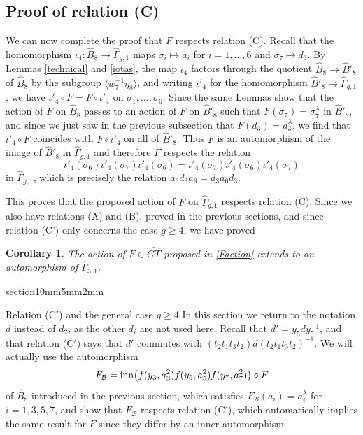 \documentclass[a4paper,10pt,reqno]{amsart}
\makeatletter
\newcommand\GT{\widehat{GT}}
\newcommand\B{\widehat{B}}
\newcommand\GGone{\widehat{\Gamma}_{g,1}}
\newtheorem{cor}[thm]{Corollary}
\renewcommand{\section}{\@startsection
{section}{1}{0mm}{5mm}{2mm}{\raggedright\bfseries}}
\makeatother
\begin{document}
\subsection{Proof of relation (C)}

We can now complete the proof that $F$ respects relation (C).
Recall that the homomorphism $\iota_4:\B_8\rightarrow \GGone$ maps $\sigma_i\mapsto a_i$
for $i=1,\ldots,6$ and $\sigma_7\mapsto d_3$. By Lemmas \ref{technical} and \ref{iotas}, 
the map $\iota_4$ factors through the quotient $\B_8\rightarrow \B'_8$ of $\B_8$ by the
subgroup $\langle w_7^{-1}\eta_8\rangle$, and writing $\iota'_4$ for the homomorphism
$\B'_8\rightarrow \GGone$, we have $\iota'_4\circ F=F\circ \iota'_4$ on $\sigma_1,\ldots,\sigma_6$.
Since the same Lemmas show that the action of $F$ on $\B_8$ passes to an action of
$F$ on $\B'_8$ such that $F(\sigma_7)=\sigma_7^\lambda$ in $\B'_8$, and since we just saw
in the previous subsection that $F(d_3)=d_3^\lambda$, we find that $\iota'_4\circ F$ coincides
with $F\circ \iota'_4$ on all of $\B'_8$. Thus $F$ is an automorphism of the image of
$\B'_8$ in $\GGone$ and therefore $F$ respects the relation
$$\iota'_4(\sigma_6) \iota'_4(\sigma_7) \iota'_4(\sigma_6)
=\iota'_4(\sigma_7) \iota'_4(\sigma_6) \iota'_4(\sigma_7)$$
in $\GGone$, which is precisely the relation $a_6d_3a_6=d_3a_6d_3$.

This proves that the proposed action of $F$ on $\GGone$ respects relation (C). Since we also
have relations (A) and (B), proved in the previous sections, and since relation (C') only
concerns the case $g\ge 4$, we have proved

\vspace{.3cm}
\begin{cor}\label{genus3} The action of $F\in\GT$ proposed in \eqref{Faction}
extends to an automorphism of $\widehat\Gamma_{3,1}$.
\end{cor}

\section{Relation (C$'$) and the general case $g\ge 4$}
In this section we return to the notation $d$ instead of $d_2$, as the other $d_i$ are not used here.
Recall that $d'=y_5dy_5^{-1}$, and
that relation (C$'$) says that $d'$ commutes with $(t_2t_1t_3t_2)d(t_2t_1t_3t_2)^{-1}$. 
We will actually use the automorphism
$$F_{\mathcal{B}}={\rm inn}\bigl(f(y_3,a_3^2)f(y_5,a_5^2)f(y_7,a_7^2)\bigr)\circ F$$ 
of $\B_8$ introduced in the previous section, which satisfies
$F_{\mathcal{B}}(a_i)=a_i^\lambda$ for $i=1,3,5,7$, and show that $F_{\mathcal{B}}$ respects
relation (C$'$), which automatically implies the same result for $F$ since they differ
by an inner automorphism.
\end{document}
